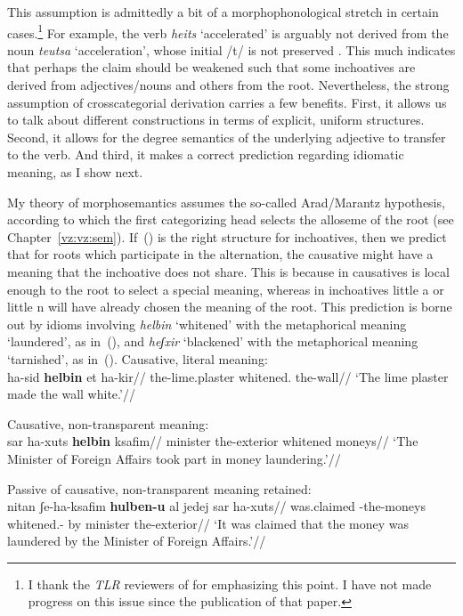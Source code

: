 This assumption is admittedly a bit of a morphophonological stretch in certain cases.\footnote{I thank the \emph{TLR} reviewers of \cite{kastner19tlr} for emphasizing this point. I have not made progress on this issue since the publication of that paper.} For example, the verb \emph{hei{ts}} `accelerated' is arguably not derived from the noun \emph{teu{ts}a} `acceleration', whose initial /t/ is not preserved \citep{batel94,arad03}. This much indicates that perhaps the claim should be weakened such that some inchoatives are derived from adjectives/nouns and others from the root. Nevertheless, the strong assumption of crosscategorial derivation carries a few benefits. First, it allows us to talk about different constructions in terms of explicit, uniform structures. Second, it allows for the degree semantics of the underlying adjective to transfer to the verb. And third, it makes a correct prediction regarding idiomatic meaning, as I show next.

My theory of morphosemantics assumes the so-called Arad/Marantz hypothesis, according to which the first categorizing head selects the alloseme of the root (see Chapter~\ref{vz:vz:sem}). If~(\lastx) is the right structure for inchoatives, then we predict that for roots which participate in the alternation, the causative might have a meaning that the inchoative does not share. This is because in causatives {\vd} is local enough to the root to select a special meaning, whereas in inchoatives little a or little n will have already chosen the meaning of the root. This prediction is borne out by idioms involving \emph{helbin} `whitened' with the metaphorical meaning `laundered', as in~(\nextx), and \emph{heʃxir} `blackened' with the metaphorical meaning `tarnished', as in~(\anextx).
\pex
	\a Causative, literal meaning:\\
		\begingl
			\gla ha-sid \textbf{helbin} et ha-kir//
			\glb the-lime.plaster whitened.  the-wall//
			\glft `The lime plaster made the wall white.'//
		\endgl
	
	\a Causative, non-transparent meaning:\\
		\begingl
			\gla sar ha-xuts \textbf{helbin} ksafim//
			\glb minister the-exterior whitened moneys//
			\glft `The Minister of Foreign Affairs took part in money laundering.'//
		\endgl
	
	\a Passive of causative, non-transparent meaning retained:\\
		\begingl
			\gla nitan ʃe-ha-ksafim \textbf{hulben-u} {al jedej} sar ha-xuts//
			\glb was.claimed -the-moneys whitened.- by minister the-exterior//
			\glft `It was claimed that the money was laundered by the Minister of Foreign Affairs.'//
		\endgl
	
